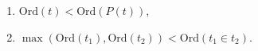 \begin{enumerate}
\item $\text{Ord}(t) < \text{Ord}(P(t))$,
\item $\max(\text{Ord}(t_1), \text{Ord}(t_2)) < \text{Ord}(t_1 \in t_2)$.
\end{enumerate}
